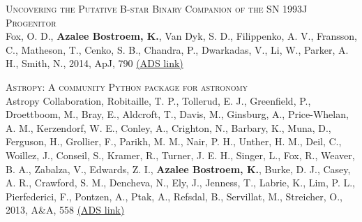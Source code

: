 \begin{revnumerate}[67]
    \item{\textsc{Uncovering the Putative B-star Binary Companion of the SN 1993J Progenitor}\\ 
    Fox, O. D., \textbf{Azalee Bostroem, K.}, Van Dyk, S. D., Filippenko, A. V., Fransson, C., Matheson, T., Cenko, S. B., Chandra, P., Dwarkadas, V., Li, W., Parker, A. H., Smith, N., 2014, ApJ, 790 
    \color{blue}\href{https://ui.adsabs.harvard.edu/abs/2014ApJ...790...17F}{(ADS link)}\color{black}}\\
    
    \item{\textsc{Astropy: A community Python package for astronomy}\\ 
    Astropy Collaboration, Robitaille, T. P., Tollerud, E. J., Greenfield, P., Droettboom, M., Bray, E., Aldcroft, T., Davis, M., Ginsburg, A., Price-Whelan, A. M., Kerzendorf, W. E., Conley, A., Crighton, N., Barbary, K., Muna, D., Ferguson, H., Grollier, F., Parikh, M. M., Nair, P. H., Unther, H. M., Deil, C., Woillez, J., Conseil, S., Kramer, R., Turner, J. E. H., Singer, L., Fox, R., Weaver, B. A., Zabalza, V., Edwards, Z. I., \textbf{Azalee Bostroem, K.}, Burke, D. J., Casey, A. R., Crawford, S. M., Dencheva, N., Ely, J., Jenness, T., Labrie, K., Lim, P. L., Pierfederici, F., Pontzen, A., Ptak, A., Refsdal, B., Servillat, M., Streicher, O., 2013, A\&A, 558 
    \color{blue}\href{https://ui.adsabs.harvard.edu/abs/2013A&A...558A..33A}{(ADS link)}\color{black}}\\
\end{revnumerate}






























